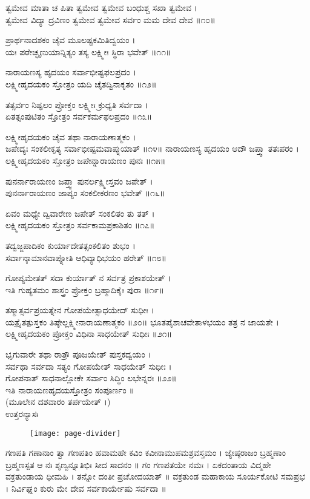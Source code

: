ತ್ವಮೇವ ಮಾತಾ ಚ ಪಿತಾ ತ್ವಮೇವ ತ್ವಮೇವ ಬಂಧುಶ್ಚ ಸಖಾ ತ್ವಮೇವ ।\\
ತ್ವಮೇವ ವಿದ್ಯಾ ದ್ರವಿಣಂ ತ್ವಮೇವ ತ್ವಮೇವ ಸರ್ವಂ ಮಮ ದೇವ ದೇವ ॥೧೦॥

	ಪ್ರಾರ್ಥನಾದಶಕಂ ಚೈವ ಮೂಲಷ್ಟಕಮಿತಿದ್ವಯಂ ।\\
	ಯಃ ಪಠೇಚ್ಛೃಣುಯಾನ್ನಿತ್ಯಂ ತಸ್ಯ ಲಕ್ಷ್ಮೀಃ ಸ್ಥಿರಾ ಭವೇತ್ ॥೧೧॥

ನಾರಾಯಣಸ್ಯ ಹೃದಯಂ ಸರ್ವಾಭೀಷ್ಟಫಲಪ್ರದಂ ।\\
ಲಕ್ಷ್ಮೀಹೃದಯಕಂ ಸ್ತೋತ್ರಂ ಯದಿ ಚೈತದ್ವಿನಾಕೃತಂ ॥೧೨॥

	ತತ್ಸರ್ವಂ ನಿಷ್ಫಲಂ ಪ್ರೋಕ್ತಂ ಲಕ್ಷ್ಮೀಃ ಕ್ರುಧ್ಯತಿ ಸರ್ವದಾ ।\\
	ಏತತ್ಸಂಪುಟಿತಂ ಸ್ತೋತ್ರಂ ಸರ್ವಕರ್ಮಫಲಪ್ರದಂ ॥೧೩॥

ಲಕ್ಷ್ಮೀಹೃದಯಕಂ ಚೈವ ತಥಾ ನಾರಾಯಣಾತ್ಮಕಂ ।\\
ಜಪೇದ್ಯಃ ಸಂಕಲೀಕೃತ್ಯ ಸರ್ವಾಭೀಷ್ಟಮವಾಪ್ನುಯಾತ್ ॥೧೪॥
\newpage
	ನಾರಾಯಣಸ್ಯ ಹೃದಯಂ ಆದೌ ಜಪ್ತ್ವಾ ತತಃಪರಂ ।\\
	ಲಕ್ಷ್ಮೀಹೃದಯಕಂ ಸ್ತೋತ್ರಂ ಜಪೇನ್ನಾರಾಯಣಂ ಪುನಃ ॥೧೫॥

ಪುನರ್ನಾರಾಯಣಂ ಜಪ್ತ್ವಾ ಪುನರ್ಲಕ್ಷ್ಮೀಸ್ತವಂ ಜಪೇತ್ ।\\
ಪುನರ್ನಾರಾಯಣಂ ಜಾಪ್ಯಂ ಸಂಕಲೀಕರಣಂ ಭವೇತ್ ॥೧೬॥

	ಏವಂ ಮಧ್ಯೇ ದ್ವಿವಾರೇಣ ಜಪೇತ್ ಸಂಕಲಿತಂ ತು ತತ್ ।\\
	ಲಕ್ಷ್ಮೀಹೃದಯಕಂ ಸ್ತೋತ್ರಂ ಸರ್ವಕಾಮಪ್ರಕಾಶಿತಂ ॥೧೭॥

ತದ್ವಜ್ಜಪಾದಿಕಂ ಕುರ್ಯಾದೇತತ್ಸಂಕಲಿತಂ ಶುಭಂ ।\\
ಸರ್ವಾನ್ಕಾಮಾನವಾಪ್ನೋತಿ ಆಧಿವ್ಯಾಧಿಭಯಂ ಹರೇತ್ ॥೧೮॥

	ಗೋಪ್ಯಮೇತತ್ ಸದಾ ಕುರ್ಯಾತ್ ನ ಸರ್ವತ್ರ ಪ್ರಕಾಶಯೇತ್ ।\\
	ಇತಿ ಗುಹ್ಯತಮಂ ಶಾಸ್ತ್ರಂ ಪ್ರೋಕ್ತಂ ಬ್ರಹ್ಮಾದಿಕೈಃ ಪುರಾ ॥೧೯॥

ತಸ್ಮಾತ್ಸರ್ವಪ್ರಯತ್ನೇನ ಗೋಪಯೇತ್ಸಾಧಯೇದ್ ಸುಧೀಃ ।\\
ಯತ್ರೈತತ್ಪುಸ್ತಕಂ ತಿಷ್ಠೇಲ್ಲಕ್ಷ್ಮೀನಾರಾಯಣಾತ್ಮಕಂ ॥೨೦॥
\newpage
	ಭೂತಪೈಶಾಚವೇತಾಳಭಯಂ ತತ್ರ ನ ಜಾಯತೇ ।\\
	ಲಕ್ಷ್ಮೀಹೃದಯಕಂ ಪ್ರೋಕ್ತಂ ವಿಧಿನಾ ಸಾಧಯೇತ್ ಸುಧೀಃ ॥೨೧॥

ಭೃಗುವಾರೇ ತಥಾ ರಾತ್ರೌ ಪೂಜಯೇತ್ ಪುಸ್ತಕದ್ವಯಂ ।\\
ಸರ್ವಥಾ ಸರ್ವದಾ ಸತ್ಯಂ ಗೋಪಯೇತ್ ಸಾಧಯೇತ್ ಸುಧೀಃ ।\\
	ಗೋಪನಾತ್ ಸಾಧನಾಲ್ಲೋಕೇ ಸರ್ವಾಂ ಸಿದ್ಧಿಂ ಲಭೇನ್ನರಃ ॥೨೨॥\\
		ಇತಿ ನಾರಾಯಣಹೃದಯಸ್ತೋತ್ರಂ ಸಂಪೂರ್ಣಂ ॥\\
		(ಮೂಲೇನ ದಶವಾರಂ ತರ್ಪಯೇತ್ ।)\\
		ಉತ್ತರನ್ಯಾಸಃ
\begin{figure}[b] \centering \texttt{[image: page-divider]} \end{figure}
ಗಣಪತಿ
ಗಣಾನಾಂ ತ್ವಾ ಗಣಪತಿಂ ಹವಾಮಹೇ ಕವಿಂ ಕವೀನಾಮುಪಮಶ್ರವಸ್ತಮಂ ।
ಜ್ಯೇಷ್ಠರಾಜಂ ಬ್ರಹ್ಮಣಾಂ ಬ್ರಹ್ಮಣಸ್ಪತ ಆ ನಃ ಶೃಣ್ವನ್ನೂತಿಭಿಃ ಸೀದ ಸಾದನಂ ॥
ಗಂ ಗಣಪತಯೇ ನಮಃ ।
ಏಕದಂತಾಯ ವಿದ್ಮಹೇ ವಕ್ರತುಂಡಾಯ ಧೀಮಹಿ । ತನ್ನೋ ದಂತೀ ಪ್ರಚೋದಯಾತ್ ॥
ವಕ್ರತುಂಡ ಮಹಾಕಾಯ ಸೂರ್ಯಕೋಟಿ ಸಮಪ್ರಭ ।
ನಿರ್ವಿಘ್ನಂ ಕುರು ಮೇ ದೇವ ಸರ್ವಕಾರ್ಯೇಷು ಸರ್ವದಾ ॥

